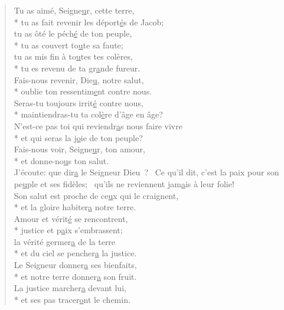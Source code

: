 
\begin{verse}
Tu as aimé, Seigne\underline{u}r, cette terre, \\*
tu as fait revenir les déport\underline{é}s de Jacob; \\
tu as ôté le péch\underline{é} de ton peuple, \\*
tu as couvert to\underline{u}te sa faute; \\
tu as mis fin à to\underline{u}tes tes colères, \\*
tu es revenu de ta gr\underline{a}nde fureur. \\

Fais-nous revenir, Die\underline{u}, notre salut, \\*
oublie ton ressentim\underline{e}nt contre nous. \\
Seras-tu toujours irrit\underline{é} contre nous, \\*
maintiendras-tu ta col\underline{è}re d’âge en âge? \\

N’est-ce pas toi qui reviendr\underline{a}s nous faire vivre \\*
et qui seras la j\underline{o}ie de ton peuple? \\
Fais-nous voir, Seigne\underline{u}r, ton amour, \\*
et donne-no\underline{u}s ton salut. \\

J’écoute: que dir\underline{a} le Seigneur Dieu ?~\psalmdagger
Ce qu’il dit, c’est la paix
pour son pe\underline{u}ple et ses fidèles;~\psalmstar
qu’ils ne reviennent jam\underline{a}is à leur folie! \\
Son salut est proche de ce\underline{u}x qui le craignent, \\*
et la gloire habiter\underline{a} notre terre. \\

Amour et vérit\underline{é} se rencontrent, \\*
justice et p\underline{a}ix s’embrassent; \\
la vérité germer\underline{a} de la terre \\*
et du ciel se pencher\underline{a} la justice. \\

Le Seigneur donner\underline{a} ses bienfaits, \\*
et notre terre donner\underline{a} son fruit. \\
La justice marcher\underline{a} devant lui, \\*
et ses pas tracer\underline{o}nt le chemin. \\
\end{verse}


